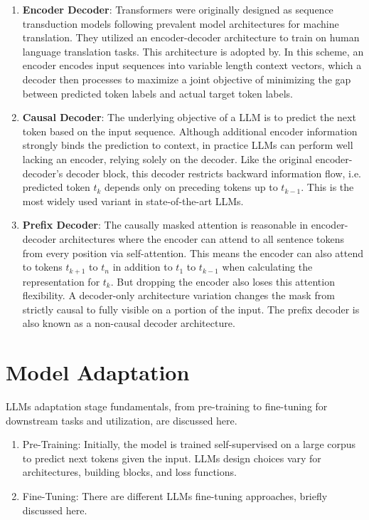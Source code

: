 \documentclass[a4paper,oneside]{book}
\begin{document}
\begin{enumerate}
  \item \textbf{Encoder Decoder}: Transformers were originally designed as sequence transduction models following prevalent model architectures for machine translation. They utilized an encoder-decoder architecture to train on human language translation tasks. This architecture is adopted by. In this scheme, an encoder encodes input sequences into variable length context vectors, which a decoder then processes to maximize a joint objective of minimizing the gap between predicted token labels and actual target token labels.

  \item \textbf{Causal Decoder}: The underlying objective of a LLM is to predict the next token based on the input sequence. Although additional encoder information strongly binds the prediction to context, in practice LLMs can perform well lacking an encoder, relying solely on the decoder. Like the original encoder-decoder's decoder block, this decoder restricts backward information flow, i.e. predicted token $t_k$ depends only on preceding tokens up to $t_{k-1}$. This is the most widely used variant in state-of-the-art LLMs.

  \item \textbf{Prefix Decoder}: The causally masked attention is reasonable in encoder-decoder architectures where the encoder can attend to all sentence tokens from every position via self-attention. This means the encoder can also attend to tokens $t_{k+1}$ to $t_n$ in addition to $t_1$ to $t_{k-1}$ when calculating the representation for $t_k$. But dropping the encoder also loses this attention flexibility. A decoder-only architecture variation changes the mask from strictly causal to fully visible on a portion of the input. The prefix decoder is also known as a non-causal decoder architecture.
\end{enumerate}

\section{Model Adaptation}
LLMs adaptation stage fundamentals, from pre-training to fine-tuning for downstream tasks and utilization, are discussed here.

\begin{enumerate}
  \item Pre-Training: Initially, the model is trained self-supervised on a large corpus to predict next tokens given the input. LLMs design choices vary for architectures, building blocks, and loss functions.

  \item Fine-Tuning: There are different LLMs fine-tuning approaches, briefly discussed here.
\end{enumerate}
\end{document}
